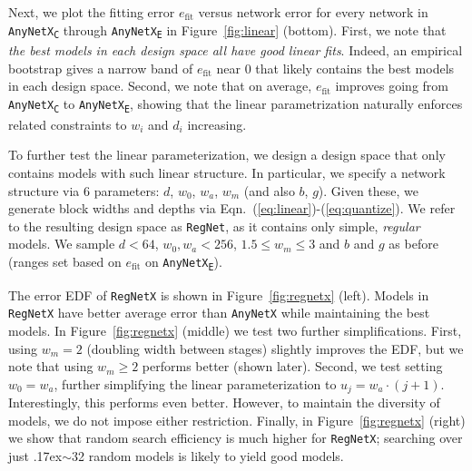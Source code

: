\documentclass[10pt,twocolumn,letterpaper]{article}
\newcommand{\app}{\raise.17ex\hbox{$\scriptstyle\sim$}}
\newcommand{\dsname}[1]{\texttt{\small #1}\xspace}
\newcommand{\anynetx}{\dsname{AnyNetX}}
\newcommand{\anynetxv}[1]{\dsname{AnyNetX\textsubscript{#1}}}
\newcommand{\regnet}{\dsname{RegNet}}
\newcommand{\regnetx}{\dsname{RegNetX}}
\begin{document}
Next, we plot the fitting error $e_\textrm{fit}$ versus network error for every network in \anynetxv{C} through \anynetxv{E} in Figure~\ref{fig:linear} (bottom). First, we note that \emph{the best models in each design space all have good linear fits}. Indeed, an empirical bootstrap gives a narrow band of $e_\textrm{fit}$ near 0 that likely contains the best models in each design space. Second, we note that on average, $e_\textrm{fit}$ improves going from \anynetxv{C} to \anynetxv{E}, showing that the linear parametrization naturally enforces related constraints to $w_i$ and $d_i$ increasing.

To further test the linear parameterization, we design a design space that only contains models with such linear structure. In particular, we specify a network structure via 6 parameters: $d$, $w_0$, $w_a$, $w_m$ (and also $b$, $g$). Given these, we generate block widths and depths via Eqn.~(\ref{eq:linear})-(\ref{eq:quantize}). We refer to the resulting design space as \regnet, as it contains only simple, \emph{regular} models. We sample $d<64$, $w_0, w_a<256$, $1.5 \le w_m \le 3$ and $b$ and $g$ as before (ranges set based on $e_\textrm{fit}$ on \anynetxv{E}).

The error EDF of \regnetx is shown in Figure~\ref{fig:regnetx} (left). Models in \regnetx have better average error than \anynetx while maintaining the best models. In Figure~\ref{fig:regnetx} (middle) we test two further simplifications. First, using $w_m=2$ (doubling width between stages) slightly improves the EDF, but we note that using $w_m\ge2$ performs better (shown later). Second, we test setting $w_0=w_a$, further simplifying the linear parameterization to $u_j = w_a \cdot (j+1)$. Interestingly, this performs even better. However, to maintain the diversity of models, we do not impose either restriction. Finally, in Figure~\ref{fig:regnetx} (right) we show that random search efficiency is much higher for \regnetx; searching over just \app32 random models is likely to yield good models.
\end{document}
